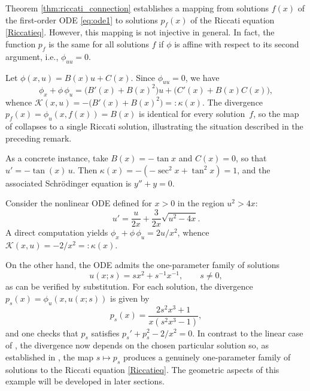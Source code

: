 \documentclass[preprint,a4paper]{elsarticle}
\begin{document}
\begin{remark}
Theorem \ref{thm:riccati_connection} establishes a mapping from solutions $f(x)$ of the first-order ODE \eqref{eq:ode1} to solutions $p_f(x)$ of the Riccati equation \eqref{Riccatieq}. However, this mapping is not injective in general. In fact, the function $p_f$ is the same for all solutions $f$ if $\phi$ is affine with respect to its second argument, i.e., $\phi_{uu} = 0$.
\end{remark}

\begin{example}\label{ex:linear}
Let $\phi(x,u)=B(x)u+C(x)$. Since $\phi_{uu}=0$, we have
\[
\phi_x+\phi\,\phi_u = \bigl(B'(x)+B(x)^2\bigr)u+\bigl(C'(x)+B(x)C(x)\bigr),
\]
whence $\mathcal{K}(x,u)=-\bigl(B'(x)+B(x)^2\bigr)=:\kappa(x)$. The divergence $p_f(x)=\phi_u(x,f(x))=B(x)$ is identical for every solution~$f$, so the map of  collapses to a single Riccati solution, illustrating the situation described in the preceding remark.

As a concrete instance, take $B(x)=-\tan x$ and $C(x)=0$, so that $u'=-\tan(x)\,u$. Then $\kappa(x)=-(-\sec^2 x+\tan^2 x)=1$, and the associated Schr\"odinger equation is $y''+y=0$.
\end{example}

\begin{example}\label{ex:euler_cauchy}
Consider the nonlinear ODE defined for $x>0$ in the region $u^2>4x$:
\begin{equation}\label{eq:euler_cauchy_ode}
u' = \frac{u}{2x}+\frac{3}{2x}\sqrt{u^2-4x}.
\end{equation}
A direct computation yields $\phi_x+\phi\,\phi_u = 2u/x^2$, whence $\mathcal{K}(x,u) = -2/x^2 = :\kappa(x)$. 

On the other hand, the ODE admits the one-parameter family of solutions
\begin{equation}\label{eq:euler_cauchy_sol}
u(x;s) = s x^2 + s^{-1} x^{-1}, \qquad s \neq 0,
\end{equation}
as can be verified by substitution. For each solution, the divergence $p_s(x) = \phi_u(x, u(x;s))$ is given by
\[
p_s(x) = \frac{2s^2 x^3 + 1}{x(s^2 x^3 - 1)},
\]
and one checks that $p_s$ satisfies $p_s' + p_s^2 - 2/x^2 = 0$. In contrast to the linear case of , the divergence now depends on the chosen particular solution so, as established in , the map $s \mapsto p_s$ produces a genuinely one-parameter family of solutions to the Riccati equation \eqref{Riccatieq}. The geometric aspects of this example will be developed in later sections.
\end{example}
\end{document}
